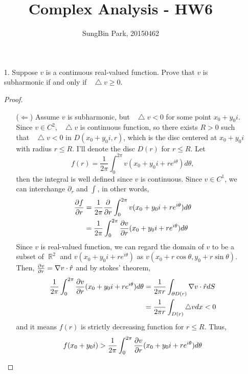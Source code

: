 \documentclass{article}
\DeclareMathOperator{\rr}{\mathbb{R}}
\newcommand*\Laplace{\mathop{}\!\mathbin\bigtriangleup}
\begin{document}
\title{Complex Analysis - HW6}
\author{SungBin Park, 20150462} 

\maketitle
\begin{enumerate}
\item[1.] Suppose $v$ is a continuous real-valued function. Prove that $v$ is subharmonic if and only if $\Laplace v\geq 0$.
\begin{proof}
\begin{enumerate}
\item[($\Leftarrow$)] Assume $v$ is subharmonic, but $\Laplace v<0$ for some point $x_0+y_0 i$. Since $v\in C^2$, $\Laplace v$ is continuous function, so there exists $R>0$ such that $\Laplace v<0$ in $D(x_0+y_0 i, r)$, which is the disc centered at $x_0+y_0 i$ with radius $r\leq R$. I'll denote the disc $D(r)$ for $r\leq R$. Let
\begin{equation*}
f(r)=\frac{1}{2\pi}\int_0^{2\pi} v(x_0+y_0 i+re^{i\theta})d\theta,
\end{equation*}
then the integral is well defined since $v$ is continuous. Since $v\in C^1$, we can interchange $\partial_r$ and $\int$, in other words,
\begin{equation*}
\begin{split}
\pdv{f}{r}&=\frac{1}{2\pi}\pdv{r}\int_0^{2\pi} v(x_0+y_0 i+re^{i\theta})d\theta \\
&=\frac{1}{2\pi}\int_0^{2\pi} {\pdv{v}{r}} (x_0+y_0 i+re^{i\theta})d\theta
\end{split}
\end{equation*}
Since $v$ is real-valued function, we can regard the domain of $v$ to be a subset of $\rr^2$ and $v(x_0+y_0 i+re^{i\theta})$ as $v(x_0+r\cos\theta,y_0+r\sin\theta)$. Then, $\pdv{v}{r}=\nabla v\cdot \hat{r}$ and by stokes' theorem,
\begin{equation*}
\begin{split}
\frac{1}{2\pi}\int_0^{2\pi} {\pdv{v}{r}} (x_0+y_0 i+re^{i\theta})d\theta &= \frac{1}{2\pi r}\int_{\partial D(r)} \nabla v\cdot \hat{r} dS \\
&=\frac{1}{2\pi r} \int_{D(r)} \Laplace v dx<0
\end{split}
\end{equation*}
and it means $f(r)$ is strictly decreasing function for $r\leq R$. Thus,
\begin{equation*}
f(x_0+y_0 i)>\frac{1}{2\pi}\int_0^{2\pi} {\pdv{v}{r}} (x_0+y_0 i+re^{i\theta})d\theta

\end{equation*}
\end{enumerate}
\end{proof}
\end{enumerate}
\end{document}
